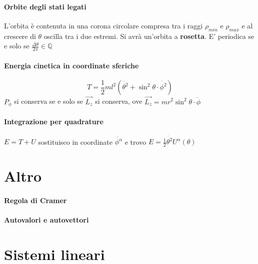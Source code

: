 \documentclass[a4paper,12pt]{article}
\begin{document}
\paragraph{Orbite degli stati legati}
L'orbita è contenuta in una corona circolare compresa tra i raggi $\rho_{min}$ e $\rho_{max}$ e al crescere di $\theta$ oscilla tra i due estremi. Si avrà un'orbita a \textbf{ rosetta}. E' periodica se e solo se $\frac{\Delta\theta}{2\pi}\in\mathbb{Q}$
\paragraph{Energia cinetica in coordinate sferiche}
\begin{displaymath}
T=\frac{1}{2}ml^2(\dot{\theta^2}+\sin^2\theta \cdot \dot{\phi^2})
\end{displaymath}
$P_{\phi}$ si conserva se e solo se $\vec{L_z}$ si conserva, ove $\vec{L_z}=mr^2\sin^2\theta\cdot\dot{\phi}$
\paragraph{Integrazione per quadrature}
$E=T+U$ sostituisco in coordinate $\dot{\phi^{\alpha}}$ e trovo $E=\frac{1}{2}\dot{\theta^2}U^{\alpha}(\theta)$

\section{Altro}
\paragraph{Regola di Cramer}
\paragraph{Autovalori e autovettori}

\section{Sistemi lineari}
\end{document}
